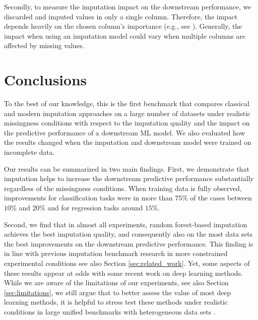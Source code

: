 \documentclass[utf8]{frontiersSCNS} %
\begin{document}
Secondly, to measure the imputation impact on the downstream performance, we discarded and imputed values in only a single column. Therefore, the impact depends heavily on the chosen column's importance (e.g., see \cite{Jenga}). Generally, the impact when using an imputation model could vary when multiple columns are affected by missing values.



\section{Conclusions}
\label{sec:conclusion}
%
To the best of our knowledge, this is the first benchmark that compares classical and modern imputation approaches on a large number of datasets under realistic missingness conditions with respect to the imputation quality and the impact on the predictive performance of a downstream ML model. We also evaluated how the results changed when the imputation and downstream model were trained on incomplete data.

Our results can be summarized in two main findings. First, we demonstrate that imputation helps to increase the downstream predictive performance substantially regardless of the missingness conditions. When training data is fully observed, improvements for classification tasks were in more than 75\% of the cases between $10\%$ and $20\%$ and for regression tasks around $15\%$.

Second, we find that in almost all experiments, random forest-based imputation achieves the best imputation quality, and consequently also on the most data sets the best improvements on the downstream predictive performance. This finding is in line with previous imputation benchmark research in more constrained experimental conditions see also Section \ref{sec:related_work}. Yet, some aspects of these results appear at odds with some recent work on deep learning methods. While we are aware of the limitations of our experiments, see also Section \ref{sec:limitations}, we still argue that to better assess the value of most deep learning methods, it is helpful to stress test these methods under realistic conditions in large unified benchmarks with heterogeneous data sets \citep{Sculley2018, Bender2021}.








\end{document}
